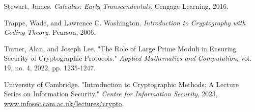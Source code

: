 \documentclass[12pt]{article}
\begin{document}
\begin{thebibliography}{9}
Stewart, James. \textit{Calculus: Early Transcendentals}. Cengage Learning, 2016.

Trappe, Wade, and Lawrence C. Washington. \textit{Introduction to Cryptography with Coding Theory}. Pearson, 2006.

Turner, Alan, and Joseph Lee. "The Role of Large Prime Moduli in Ensuring Security of Cryptographic Protocols." \textit{Applied Mathematics and Computation}, vol. 19, no. 4, 2022, pp. 1235-1247.

University of Cambridge. "Introduction to Cryptographic Methods: A Lecture Series on Information Security." \textit{Centre for Information Security}, 2023, \url{www.infosec.cam.ac.uk/lectures/crypto}.

\end{thebibliography}
\end{document}

